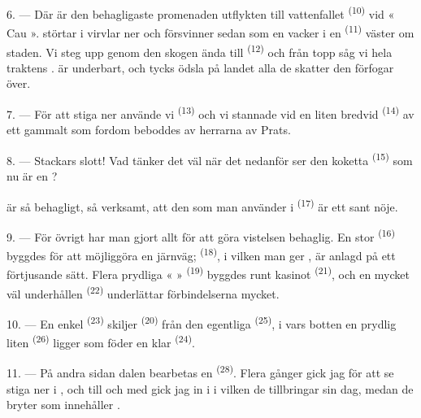 \VUsaut{3.0mm}
\VUsaut{3.0mm}

6. --- Där är den behagligaste promenaden utflykten till vattenfallet
\textsuperscript{(10)} vid « Cau ».  störtar i virvlar ner
och försvinner sedan som en vacker  i en 
\textsuperscript{(11)} väster om staden. Vi steg upp genom den skogen ända till
 \textsuperscript{(12)} och från
 topp såg vi hela traktens .
 är underbart, och  tycks ödsla på landet alla
de skatter den förfogar över.

7. --- För att stiga ner använde vi  \textsuperscript{(13)}
och vi stannade vid en liten  bredvid 
\textsuperscript{(14)} av ett gammalt  som fordom beboddes av
herrarna av Prats.

8. --- Stackars slott! Vad tänker det väl när det nedanför ser den koketta
 \textsuperscript{(15)} som nu är en ?

 är så behagligt,  så verksamt, att den
 som man använder i  \textsuperscript{(17)} är ett
sant nöje.

\VUsaut{3.0mm}
\VUsaut{3.0mm}

9. --- För övrigt har man gjort allt för att göra vistelsen behaglig. En stor
 \textsuperscript{(16)} byggdes för att möjliggöra en järnväg;
  \textsuperscript{(18)}, i vilken man ger
, är anlagd på ett förtjusande sätt. Flera prydliga
«  » \textsuperscript{(19)} byggdes runt kasinot
\textsuperscript{(21)}, och en mycket väl underhållen 
\textsuperscript{(22)} underlättar förbindelserna mycket.

10. --- En enkel  \textsuperscript{(23)} skiljer 
\textsuperscript{(20)} från den egentliga  \textsuperscript{(25)},
i vars botten en prydlig liten  \textsuperscript{(26)} ligger som
föder en klar  \textsuperscript{(24)}.

11. --- På andra sidan dalen bearbetas en 
\textsuperscript{(28)}. Flera gånger gick jag för att se 
stiga ner i , och till och med gick jag in i  i
vilken de tillbringar sin dag, medan de bryter  som innehåller
.

